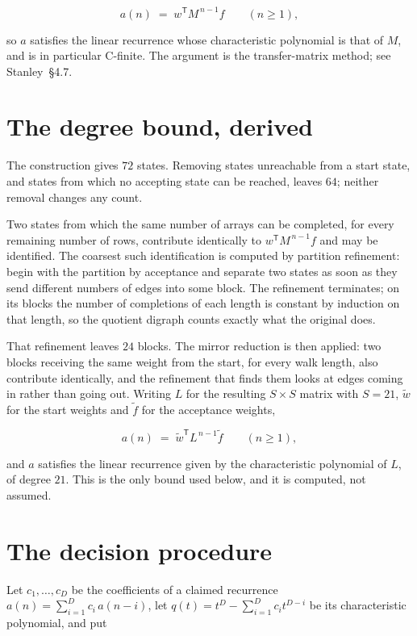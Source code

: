 \documentclass[11pt]{article}
\theoremstyle{definition}
\begin{document}
\[a(n) \;=\; w^{\mathsf T} M^{\,n-1} f \qquad (n \ge 1),\]

so $a$ satisfies the linear recurrence whose characteristic polynomial is that of $M$, and is in particular C-finite. The argument is the transfer-matrix method; see Stanley~\S4.7.

\section{The degree bound, derived}

The construction gives $72$ states. Removing states unreachable from a start state, and states from which no accepting state can be reached, leaves $64$; neither removal changes any count.

Two states from which the same number of arrays can be completed, for every remaining number of rows, contribute identically to $w^{\mathsf T}M^{\,n-1}f$ and may be identified. The coarsest such identification is computed by partition refinement: begin with the partition by acceptance and separate two states as soon as they send different numbers of edges into some block. The refinement terminates; on its blocks the number of completions of each length is constant by induction on that length, so the quotient digraph counts exactly what the original does.

That refinement leaves $24$ blocks. The mirror reduction is then applied: two blocks receiving the same weight from the start, for every walk length, also contribute identically, and the refinement that finds them looks at edges coming in rather than going out. Writing $L$ for the resulting $S \times S$ matrix with $S = 21$, $\tilde w$ for the start weights and $\tilde f$ for the acceptance weights,

\[a(n) \;=\; \tilde w^{\mathsf T} L^{\,n-1} \tilde f \qquad (n \ge 1),\]

and $a$ satisfies the linear recurrence given by the characteristic polynomial of $L$, of degree $21$. This is the only bound used below, and it is computed, not assumed.

\section{The decision procedure}

Let $c_1,\dots,c_D$ be the coefficients of a claimed recurrence $a(n) = \sum_{i=1}^{D} c_i\,a(n-i)$, let $q(t) = t^{D} - \sum_{i=1}^{D} c_i t^{D-i}$ be its characteristic polynomial, and put
\end{document}
